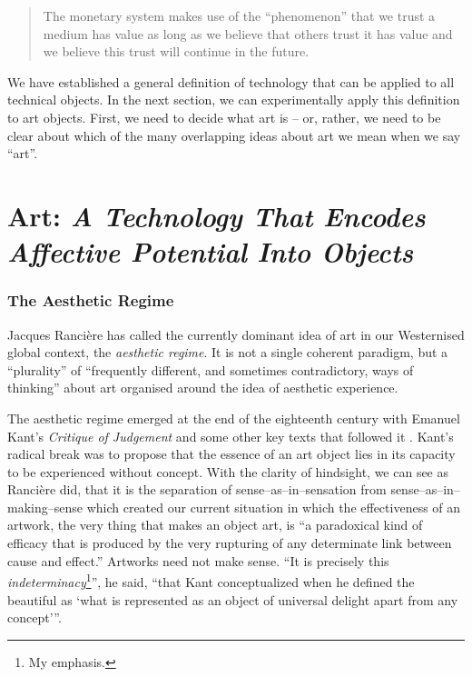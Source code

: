 \documentclass[letterpaper]{article}
\begin{document}
    \begin{quote}
        The monetary system makes use of the “phenomenon” that we trust a medium has value as long as we believe that others trust it has value and we believe this trust will continue in the future. \citep[p.55]{theNatureOfTechnology2009}
    \end{quote}

    We have established a general definition of technology that can be applied to all technical objects. In the next section, we can experimentally apply this definition to art objects. First, we need to decide what art is – or, rather, we need to be clear about which of the many overlapping ideas about art we mean when we say “art”.

\section{Art: \emph{A Technology That Encodes Affective Potential Into Objects}}

    \subsubsection{The Aesthetic Regime}

    Jacques Rancière has called the currently dominant idea of art in our Westernised global context, the \emph{aesthetic regime}. It is not a single coherent paradigm, but a “plurality” of “frequently different, and sometimes contradictory, ways of thinking” \citep[p.8]{RanciereMdrnTms2022} about art organised around the idea of aesthetic experience.
    
    The aesthetic regime emerged at the end of the eighteenth century with Emanuel Kant's \emph{Critique of Judgement} and some other key texts that followed it \citep[pp.23–24]{RancierPltcsOfThAsthtcs2004}. Kant's radical break was to propose that the essence of an art object lies in its capacity to be experienced without concept. With the clarity of hindsight, we can see as Rancière did, that it is the separation of sense–as–in–sensation from sense–as–in–making–sense which created our current situation in which the effectiveness of an artwork, the very thing that makes an object art, is “a paradoxical kind of efficacy that is produced by the very rupturing of any determinate link between cause and effect.” Artworks need not make sense. “It is precisely this \emph{indeterminacy}\footnote{
        My emphasis.
    }”, he said, “that Kant conceptualized when he defined the beautiful as ‘what is represented as an object of universal delight apart from any concept’”. \citep[p.51-52]{RancierThEmncptdSpcttr2009}
\end{document}
